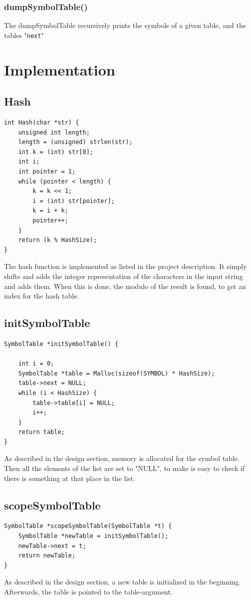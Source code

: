 \documentclass[a4paper,10pt,titlepage]{report}
\begin{document}
\subsubsection{dumpSymbolTable()}
The dumpSymbolTable recursively prints the symbols of a given table, and the tables "\verb!next!"




\newpage
\section{Implementation}
\subsection{Hash} 
\begin{lstlisting}
int Hash(char *str) {
    unsigned int length;
    length = (unsigned) strlen(str);
    int k = (int) str[0];
    int i;
    int pointer = 1;
    while (pointer < length) {
        k = k << 1;
        i = (int) str[pointer];
        k = i + k;
        pointer++;
    }
    return (k % HashSize);
}
\end{lstlisting}
The hash function is implemented as listed in the project description. It simply shifts and adds the integer representation of the characters in the input string and adds them. When this is done, the modulo of the result is found, to get an index for the hash table.

\subsection{initSymbolTable}
\begin{lstlisting}
SymbolTable *initSymbolTable() {

    int i = 0;
    SymbolTable *table = Malloc(sizeof(SYMBOL) * HashSize);
    table->next = NULL;
    while (i < HashSize) {
        table->table[i] = NULL;
        i++;
    }
    return table;
}
\end{lstlisting}
As described in the design section, memory is allocated for the symbol table. Then all the elements of the list are set to "NULL", to make is easy to check if there is something at that place in the list. 

\subsection{scopeSymbolTable}
\begin{lstlisting}
SymbolTable *scopeSymbolTable(SymbolTable *t) {
    SymbolTable *newTable = initSymbolTable();
    newTable->next = t;
    return newTable;
}
\end{lstlisting}
As described in the design section, a new table is initialized in the beginning. Afterwards, the table is pointed to the table-argument.
\end{document}

